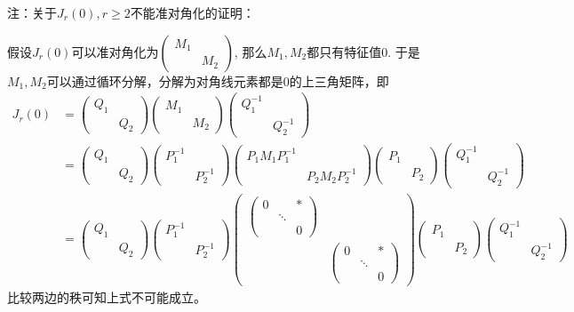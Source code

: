 注：关于$J_{r}(0), r \geqslant 2$不能准对角化的证明：

假设$J_{r}(0)$可以准对角化为$\begin{pmatrix} M_1 & \\ & M_2 \end{pmatrix}$, 那么$M_1, M_2$都只有特征值$0$. 于是$M_1, M_2$可以通过循环分解，分解为对角线元素都是$0$的上三角矩阵，即
\begin{align*}
J_{r}(0) & = \begin{pmatrix} Q_1 & \\ & Q_2 \end{pmatrix} \begin{pmatrix} M_1 & \\ & M_2 \end{pmatrix} \begin{pmatrix} Q_1^{-1} & \\ & Q_2^{-1} \end{pmatrix} \\
& = \begin{pmatrix} Q_1 & \\ & Q_2 \end{pmatrix} \begin{pmatrix} P_1^{-1} & \\ & P_2^{-1} \end{pmatrix} \begin{pmatrix} P_1M_1P_1^{-1} & \\ & P_2M_2P_2^{-1} \end{pmatrix} \begin{pmatrix} P_1 & \\ & P_2 \end{pmatrix} \begin{pmatrix} Q_1^{-1} & \\ & Q_2^{-1} \end{pmatrix} \\
& = \begin{pmatrix} Q_1 & \\ & Q_2 \end{pmatrix} \begin{pmatrix} P_1^{-1} & \\ & P_2^{-1} \end{pmatrix} \begin{pmatrix} \begin{pmatrix} 0 & & \ast \\ & \ddots & \\ & & 0 \end{pmatrix} & \\ & \begin{pmatrix} 0 & & \ast \\ & \ddots & \\ & & 0 \end{pmatrix} \end{pmatrix} \begin{pmatrix} P_1 & \\ & P_2 \end{pmatrix} \begin{pmatrix} Q_1^{-1} & \\ & Q_2^{-1} \end{pmatrix}
\end{align*}
比较两边的秩可知上式不可能成立。


